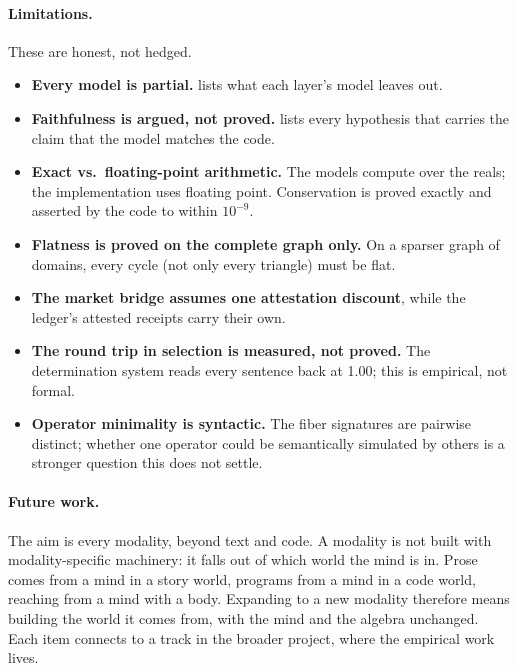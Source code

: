 \documentclass[11pt]{article}
\theoremstyle{remark}
\begin{document}
\paragraph{Limitations.}

These are honest, not hedged.

\begin{itemize}[nosep]
    \item \textbf{Every model is partial.}  lists what each layer's
    model leaves out.
    \item \textbf{Faithfulness is argued, not proved.}  lists every
    hypothesis that carries the claim that the model matches the code.
    \item \textbf{Exact vs.\ floating-point arithmetic.} The models compute over the
    reals; the implementation uses floating point. Conservation is proved exactly and
    asserted by the code to within $10^{-9}$.
    \item \textbf{Flatness is proved on the complete graph only.} On a sparser graph of
    domains, every cycle (not only every triangle) must be flat.
    \item \textbf{The market bridge assumes one attestation discount}, while the ledger's
    attested receipts carry their own.
    \item \textbf{The round trip in selection is measured, not proved.} The determination
    system reads every sentence back at 1.00; this is empirical, not formal.
    \item \textbf{Operator minimality is syntactic.} The fiber signatures are pairwise
    distinct; whether one operator could be semantically simulated by others is a stronger
    question this does not settle.
\end{itemize}

\paragraph{Future work.}

The aim is every modality, beyond text and code. A modality is not built with
modality-specific machinery: it falls out of which world the mind is in. Prose comes from a
mind in a story world, programs from a mind in a code world, reaching from a mind with a
body. Expanding to a new modality therefore means building the world it comes from, with the
mind and the algebra unchanged. Each item connects to a track in the broader project, where
the empirical work lives.
\end{document}
